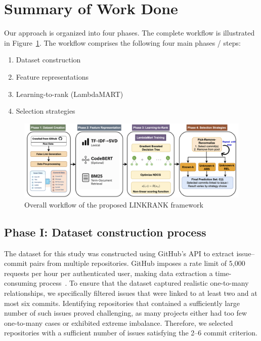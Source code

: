 \section{Summary of Work Done}


Our approach is organized into four phases. The complete workflow is illustrated in Figure~\ref{fig:approach}. The workflow comprises the following four main phases / steps:
\begin{enumerate}
    \setlength{\itemsep}{2pt}
    \setlength{\parskip}{0pt}
    \item Dataset construction
    \item Feature representations
    \item Learning-to-rank (LambdaMART)
    \item Selection strategies
\end{enumerate}

\begin{figure}[h!]
    \centering
    \includegraphics[width=\textwidth]{figures/App.png}
    \caption{Overall workflow of the proposed LINKRANK framework}
    \label{fig:approach}
\end{figure}




\subsection{Phase I: Dataset construction process}


The dataset for this study was constructed using GitHub’s API to extract issue--commit pairs from multiple repositories. GitHub imposes a rate limit of 5,000 requests per hour per authenticated user, making data extraction a time-consuming process~\cite{GitHubAPI}. To ensure that the dataset captured realistic one-to-many relationships, we specifically filtered issues that were linked to at least two and at most six commits. Identifying repositories that contained a sufficiently large number of such issues proved challenging, as many projects either had too few one-to-many cases or exhibited extreme imbalance. Therefore, we selected repositories with a sufficient number of issues satisfying the 2–6 commit criterion. 

